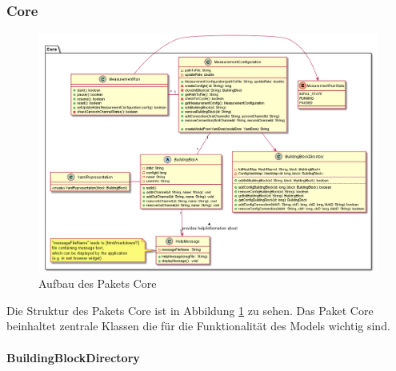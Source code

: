 \documentclass[parskip=full]{scrartcl}
\begin{document}
\subsubsection{Core}

\begin{figure}[htbp]
	\begin{center}
		\includegraphics[width = 16cm]{Grafiken/ModelCore.png}
		\caption{Aufbau des Pakets Core}
		\label{ModelCore}
	\end{center}
\end{figure}

Die Struktur des Pakets Core ist in Abbildung \ref{ModelCore} zu sehen. Das Paket Core beinhaltet zentrale Klassen die für die Funktionalität des Models wichtig sind. 


\paragraph{BuildingBlockDirectory}
\end{document}
